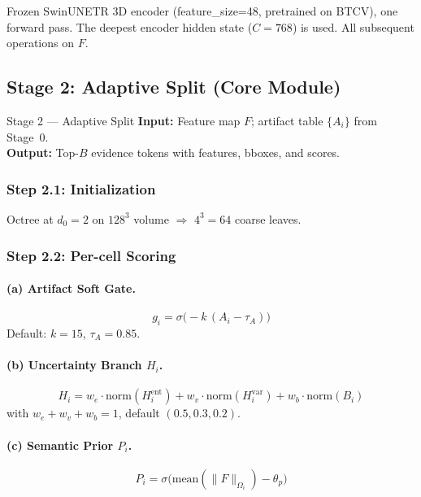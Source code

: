 \documentclass[11pt,a4paper]{article}
\newcommand{\sigmoid}{\sigma}
\begin{document}
Frozen SwinUNETR 3D encoder (feature\_size=48, pretrained on BTCV), one forward pass. The deepest encoder hidden state ($C{=}768$) is used. All subsequent operations on $F$.

\subsection{Stage 2: Adaptive Split (Core Module)}
\label{sec:split}

\begin{stagebox}{Stage 2 --- Adaptive Split}
\textcolor{inputcolor}{\textbf{Input:}} Feature map $F$; artifact table $\{A_i\}$ from Stage~0.\\
\textcolor{outputcolor}{\textbf{Output:}} Top-$B$ evidence tokens with features, bboxes, and scores.
\end{stagebox}

\subsubsection{Step 2.1: Initialization}
Octree at $d_0 = 2$ on $128^3$ volume $\Rightarrow$ $4^3 = 64$ coarse leaves.

\subsubsection{Step 2.2: Per-cell Scoring}

\paragraph{(a) Artifact Soft Gate.}
\begin{equation}
g_i = \sigmoid\!\big(-k\,(A_i - \tau_A)\big)
\label{eq:softgate}
\end{equation}
Default: $k=15$, $\tau_A=0.85$.

\paragraph{(b) Uncertainty Branch $H_i$.}
\begin{equation}
H_i = w_e \cdot \mathrm{norm}(H_i^{\mathrm{ent}}) + w_v \cdot \mathrm{norm}(H_i^{\mathrm{var}}) + w_b \cdot \mathrm{norm}(B_i)
\end{equation}
with $w_e{+}w_v{+}w_b{=}1$, default $(0.5, 0.3, 0.2)$.

\paragraph{(c) Semantic Prior $P_i$.}
\begin{equation}
P_i = \sigmoid\!\big(\mathrm{mean}(\lVert F\rVert_{\Omega_i}) - \theta_p\big)
\end{equation}
\end{document}
